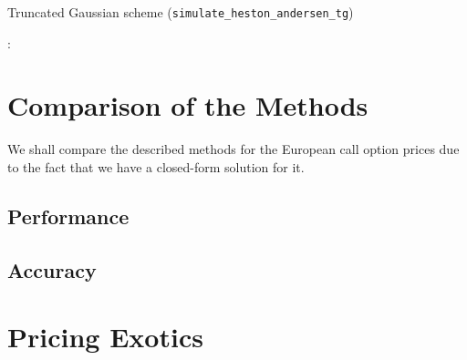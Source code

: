         \begin{algorithm}[htbp]
            \caption{Truncated Gaussian scheme (\texttt{simulate\_heston\_andersen\_tg})}
            \label{alg:andersen_tg}
            \begin{algorithmic}
                : 
            \end{algorithmic}
        \end{algorithm}



\chapter{Comparison of the Methods}
    We shall compare the described methods for the European call option prices due to the fact that we have a 
    closed-form solution for it.
    \section{Performance}

    \section{Accuracy}

\chapter{Pricing Exotics}